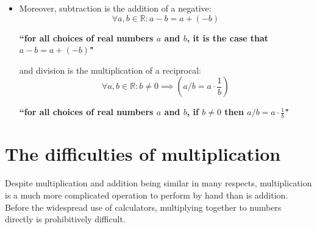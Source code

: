 \documentclass{article}
\begin{document}
\begin{itemize}
\item Moreover, subtraction is the addition of a negative:
\[\forall a, b \in \mathbb{R} :  a - b = a + (-b)\] 
\begin{center}\textbf{``for all choices of real numbers \(a\) and \(b\), it is the case that \(a - b = a + (-b)\)"}\end{center} 
and division is the multiplication of a reciprocal:
\[\forall a, b \in \mathbb{R} :  b \neq 0 \implies (a / b = a \cdot \frac{1}{b})\] 
\begin{center}\textbf{``for all choices of real numbers \(a\) and \(b\), if \(b \neq 0\) then \(a / b = a \cdot \frac{1}{b}\)"}\end{center} 
\end{itemize}



\section*{The difficulties of multiplication}

Despite multiplication and addition being similar in many respects, multiplication is a much more complicated operation to perform by hand than is addition. Before the widespread use of calculators, multiplying together to numbers directly is prohibitively difficult.
\end{document}
